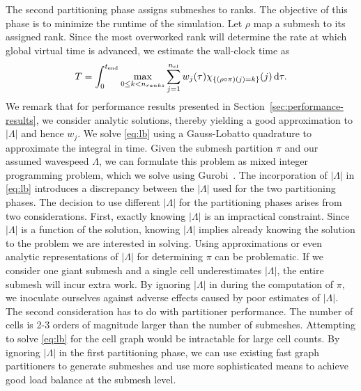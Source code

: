 The second partitioning phase assigns submeshes to ranks. The objective of this phase is to minimize the runtime of the simulation. Let $\rho$ map a submesh to its assigned rank. Since the most overworked rank will determine the rate at which global virtual time is advanced, we estimate the wall-clock time as
\begin{equation}
T = \int_0^{t_{\text{end}}} \max_{0 \le k < n_{ranks}} \sum_{j=1}^{n_{el}}  w_j(\tau) \chi_{\{(\rho \circ \pi)(j) = k\}}(j) \,\mathrm{d} \tau.
\label{eq:lb}
\end{equation}
We remark that for performance results presented in Section~\ref{sec:performance-results}, we consider analytic solutions, thereby yielding a good approximation to $|\Lambda|$ and hence $w_j$. We solve \eqref{eq:lb} using a Gauss-Lobatto quadrature to approximate the integral in time. Given the submesh partition $\pi$ and our assumed wavespeed $\Lambda$, we can formulate this problem as mixed integer programming problem, which we solve using Gurobi~\cite{Gurobi}.  The incorporation of $|\Lambda|$ in \eqref{eq:lb} introduces a discrepancy between the $|\Lambda|$ used for the two partitioning phases. The decision to use different $|\Lambda|$ for the partitioning phases arises from two considerations. First, exactly knowing $|\Lambda|$ is an impractical constraint. Since $|\Lambda|$ is a function of the solution, knowing $|\Lambda|$ implies already knowing the solution to the problem we are interested in solving. Using approximations or even analytic representations of $|\Lambda|$ for determining $\pi$ can be problematic. If we consider one giant submesh and a single cell underestimates $|\Lambda|$, the entire submesh will incur extra work. By ignoring $|\Lambda|$ in during the computation of $\pi$, we inoculate ourselves against adverse effects caused by poor estimates of $|\Lambda|$. The second consideration has to do with partitioner performance. The number of cells is 2-3 orders of magnitude larger than the number of submeshes. Attempting to solve \eqref{eq:lb} for the cell graph would be intractable for large cell counts. By ignoring $|\Lambda|$ in the first partitioning phase, we can use existing fast graph partitioners to generate submeshes and use more sophisticated means to achieve good load balance at the submesh level.

